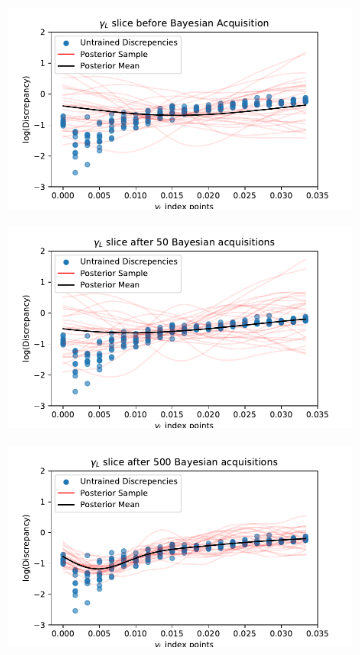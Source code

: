 \begin{figure}[htbp]
\begin{subfigure}[b]{0.33\textwidth}
    \end{subfigure}
    \begin{subfigure}[b]{0.33\textwidth}
        \centering
        \includegraphics[width=\textwidth]{../champagne_GP_images/initial_gamma_L_slice_log_discrep.pdf}
    \end{subfigure}%
    \hfill%
    \begin{subfigure}[b]{0.33\textwidth}
        \centering
        \includegraphics[width=\textwidth]{../champagne_GP_images/gamma_L_slice_50_bolfi_updates_log_discrep.pdf}
    \end{subfigure}%
    \hfill%
    \begin{subfigure}[b]{0.33\textwidth}
        \centering
        \includegraphics[width=\textwidth]{../champagne_GP_images/gamma_L_slice_500_bolfi_updates_log_discrep.pdf}

\end{subfigure}
\end{figure}

